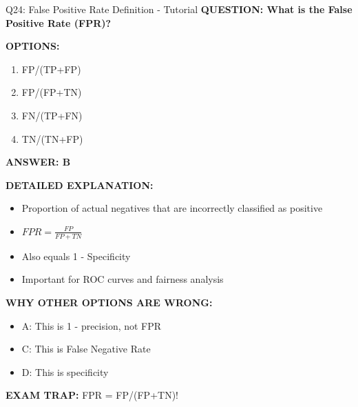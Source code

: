 \documentclass[8pt]{beamer}
\begin{document}
	\begin{frame}{Q24: False Positive Rate Definition - Tutorial}
		\fontsize{6.5}{7.5}\selectfont
		\textbf{QUESTION: What is the False Positive Rate (FPR)?}
		
		\vspace{0.1cm}
		\textbf{OPTIONS:}
		\begin{enumerate}
			\item FP/(TP+FP)
			\item FP/(FP+TN)
			\item FN/(TP+FN)
			\item TN/(TN+FP)
		\end{enumerate}
		
		\vspace{0.1cm}
		\textcolor{myblue}{\textbf{ANSWER: B}}
		
		\vspace{0.1cm}
		\textbf{DETAILED EXPLANATION:}
		\begin{itemize}
			\item Proportion of actual negatives that are incorrectly classified as positive
			\item $FPR = \frac{FP}{FP+TN}$
			\item Also equals 1 - Specificity
			\item Important for ROC curves and fairness analysis
		\end{itemize}
		
		\vspace{0.1cm}
		\textcolor{myred}{\textbf{WHY OTHER OPTIONS ARE WRONG:}}
		\begin{itemize}
			\item \textcolor{myred}{A:} This is 1 - precision, not FPR
			\item \textcolor{myred}{C:} This is False Negative Rate
			\item \textcolor{myred}{D:} This is specificity
		\end{itemize}
		
		\textcolor{myred}{\textbf{EXAM TRAP:}} FPR = \textcolor{myblue}{FP/(FP+TN)}!
	\end{frame}
	
\end{document}
